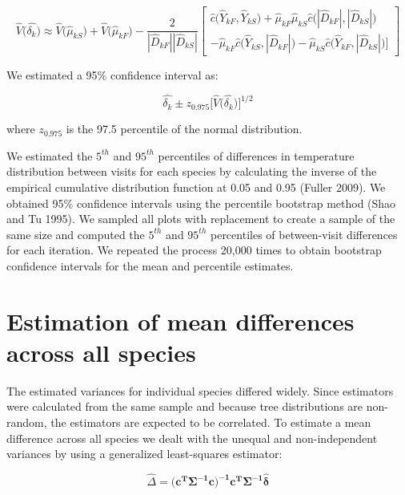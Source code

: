 \documentclass[12pt]{article}
\begin{document}
 \begin{equation} \label{eq:grandvar}
\hat{V}\big(\hat{\delta_k}\big) \approx \hat{V}\big(\hat\mu_{kS}\big) + \hat{V}\big(\hat\mu_{kF}\big) - \frac{2}{|\hat{D}_{kF}||\hat{D}_{kS}|} 
\begin{bmatrix}  \hat{c}\big( \hat{Y}_{kF}, \hat{Y}_{kS} \big) + \hat{\mu}_{kF}\hat{\mu}_{kS}\hat{c}\big( |\hat{D}_{kF}|, |\hat{D}_{kS}| \big) \\ - \hat{\mu}_{kF}\hat{c}\big( \hat{Y}_{kS}, |\hat{D}_{kF}| \big)  - \hat{\mu}_{kS}\hat{c}\big( \hat{Y}_{kF}, |\hat{D}_{kS}| \big)  \Big]
\end{bmatrix}
\end{equation}

We estimated a 95\% confidence interval as:

\begin{equation} \label{eq:ci}
\hat{\delta_k} \pm z_{0.975} \Big[\hat{V}\Big(\hat{\delta_k} \Big)\Big]^{1/2}
\end{equation}

where $z_{0.975}$ is the 97.5 percentile of the normal distribution.  

We estimated the $5^{th}$ and $95^{th}$ percentiles of differences in temperature distribution between visits for each species by calculating the inverse of the empirical cumulative distribution function at 0.05 and 0.95 (Fuller 2009).  We obtained 95\% confidence intervals using the percentile bootstrap method (Shao and Tu 1995).   We sampled all plots with replacement to create a sample of the same size and computed the $5^{th}$ and $95^{th}$ percentiles of between-visit differences for each iteration.  We repeated the process 20,000 times to obtain bootstrap confidence intervals for the mean and percentile estimates. 

\section*{Estimation of mean differences across all species} 
The estimated variances for individual species differed widely.  Since estimators were calculated from the same sample and because tree distributions are non-random, the estimators are expected to be correlated.  To estimate a mean difference across all species we dealt with the unequal and non-independent variances by using a generalized least-squares estimator:

 \begin{equation} \label{eq:gls}
\hat{\Delta} = \big(\mathbf{c^T\Sigma^{-1}c\big)^{-1}c^T\Sigma^{-1}}\hat{\boldsymbol{\delta}}
\end{equation}
\end{document}
